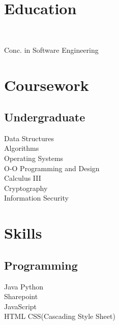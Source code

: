 \documentclass[]{deedy-resume-openfont}
\begin{document}
\begin{minipage}[t]{0.25\textwidth} 


\section{Education} 



\\

\large
Conc. in Software Engineering \\


\sectionsep










\section{Coursework}
\subsection{Undergraduate}
Data Structures \\
Algorithms \\
Operating Systems \\
O-O Programming and Design \\
Calculus III \\
Cryptography \\
Information Security \\
\sectionsep




\section{Skills}
\subsection{Programming}
\large
\textbullet{} Java \textbullet{}   Python   \\ 
\textbullet{} Sharepoint \\
\textbullet{} JavaScript\\
\textbullet{} HTML 
\textbullet{} CSS(Cascading Style Sheet) \\
\sectionsep


\end{minipage}
\end{document}

